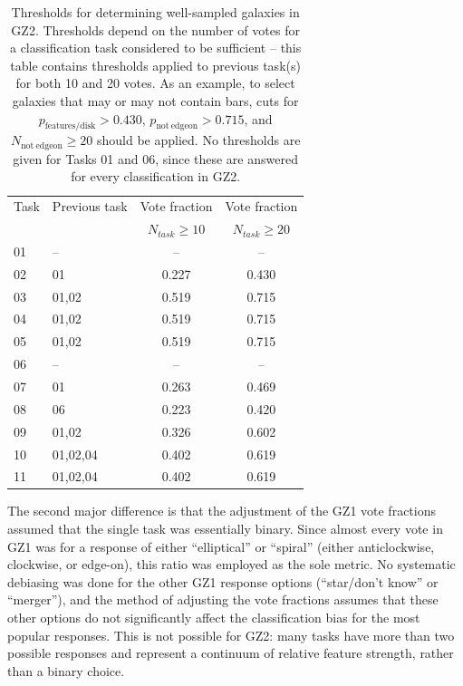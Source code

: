 \documentclass[useAMS,usenatbib]{mn2e}
\begin{document}
\begin{table}
\centering
 \begin{tabular}{@{}llcc}
 \hline
\multicolumn{1}{l}{Task} &
\multicolumn{1}{l}{Previous task} &
\multicolumn{1}{c}{Vote fraction} &
\multicolumn{1}{c}{Vote fraction}
\\ 
\multicolumn{1}{l}{} &
\multicolumn{1}{l}{} &
\multicolumn{1}{c}{$N_{task}\geq10$} &
\multicolumn{1}{c}{$N_{task}\geq20$}
\\ 
\hline					
01                      & --        & --        & --        \\
02                      & 01        & 0.227     & 0.430     \\
03                      & 01,02     & 0.519     & 0.715     \\
04                      & 01,02     & 0.519     & 0.715     \\
05                      & 01,02     & 0.519     & 0.715     \\
06                      & --        & --        & --        \\
07                      & 01        & 0.263     & 0.469     \\
08                      & 06        & 0.223     & 0.420     \\
09                      & 01,02     & 0.326     & 0.602     \\
10                      & 01,02,04  & 0.402     & 0.619     \\
11                      & 01,02,04  & 0.402     & 0.619     \\
\hline
 \end{tabular}
 \caption{Thresholds for determining well-sampled galaxies in GZ2. Thresholds depend on the number of votes for a classification task considered to be sufficient -- this table contains thresholds applied to previous task(s) for both 10 and 20 votes. As an example, to select galaxies that may or may not contain bars, cuts for $p_\mathrm{features/disk}>0.430$, $p_\mathrm{not~edgeon}>0.715$, and $N_\mathrm{not~edgeon}\geq20$ should be applied. No thresholds are given for Tasks 01 and 06, since these are answered for every classification in GZ2. \label{tbl-thresholds}}
\end{table}

The second major difference is that the adjustment of the GZ1 vote fractions assumed that the single task was essentially binary. Since almost every vote in GZ1 was for a response of either ``elliptical'' or ``spiral'' (either anticlockwise, clockwise, or edge-on), this ratio was employed as the sole metric. No systematic debiasing was done for the other GZ1 response options (``star/don't know'' or ``merger''), and the method of adjusting the vote fractions assumes that these other options do not significantly affect the classification bias for the most popular responses. This is not possible for GZ2: many tasks have more than two possible responses and represent a continuum of relative feature strength, rather than a binary choice.
\end{document}
